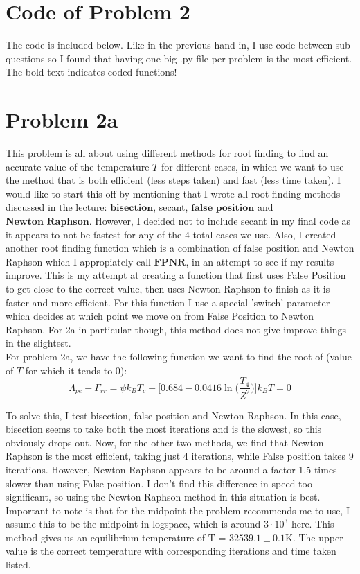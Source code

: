 \section*{Code of Problem 2}

The code is included below. Like in the previous hand-in, I use code between sub-questions so I found that having one big .py file per problem is the most efficient. The bold text indicates coded functions! 



\section*{Problem 2a}

This problem is all about using different methods for root finding to find an accurate value of the temperature $T$ for different cases, in which we want to use the method that is both efficient (less steps taken) and fast (less time taken). I would like to start this off by mentioning that I wrote all root finding methods discussed in the lecture: $\textbf{bisection}$, secant, $\textbf{false position}$ and $\textbf{Newton Raphson}$. However, I decided not to include secant in my final code as it appears to not be fastest for any of the 4 total cases we use. Also, I created another root finding function which is a combination of false position and Newton Raphson which I appropiately call $\textbf{FPNR}$, in an attempt to see if my results improve. This is my attempt at creating a function that first uses False Position to get close to the correct value, then uses Newton Raphson to finish as it is faster and more efficient. For this function I use a special 'switch' parameter which decides at which point we move on from False Position to Newton Raphson. For 2a in particular though, this method does not give improve things in the slightest.\\

For problem 2a, we have the following function we want to find the root of (value of $T$ for which it tends to 0):\\

\begin{equation}
	\Lambda_{pe} - \Gamma_{rr} = \psi k_B T_c - \Bigg[0.684 - 0.0416 \ln \Big(\frac{T_4}{Z^2}\Big) \Bigg] k_B T = 0
\end{equation}

To solve this, I test bisection, false position and Newton Raphson. In this case, bisection seems to take both the most iterations and is the slowest, so this obviously drops out. Now, for the other two methods, we find that Newton Raphson is the most efficient, taking just 4 iterations, while False position takes 9 iterations. However, Newton Raphson appears to be around a factor 1.5 times slower than using False position. I don't find this difference in speed too significant, so using the Newton Raphson method in this situation is best. Important to note is that for the midpoint the problem recommends me to use, I assume this to be the midpoint in logspace, which is around $3 \cdot 10^3$ here. This method gives us an equilibrium temperature of T = $32539.1 \pm 0.1$K. The upper value is the correct temperature with corresponding iterations and time taken listed.

